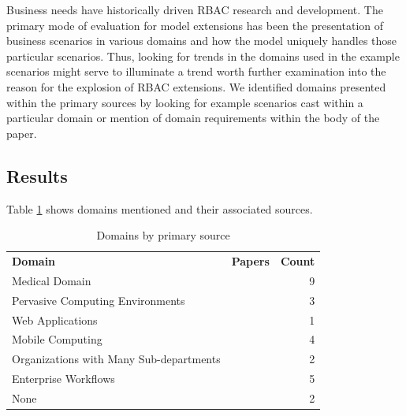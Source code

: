 Business needs have historically driven RBAC research and development.  The primary mode of evaluation for
model extensions has been the presentation of business scenarios in various domains and how the model
uniquely handles those particular scenarios.  Thus, looking for trends in the domains used in the example
scenarios might serve to illuminate a trend worth further examination into the reason for the explosion of
RBAC extensions.  We identified domains presented within the primary sources by looking for example
scenarios cast within a particular domain or mention of domain requirements within the body of the paper.

\subsection{Results}

Table \ref{tab:domains} shows domains mentioned and their associated sources.

\begin{table}
\centering
\caption{Domains by primary source}
\vspace{0.1 in}
\begin{tabular*}{.9\linewidth}{| p{.45\linewidth} | p{.3\linewidth} | r | }
\cline{1-3}

\textbf{Domain} & \textbf{Papers} & \textbf{Count} \\ \cline{1-3}
Medical Domain
&
\cite{alam06:constraint}
\cite{tzelepi01:flexible}
\cite{motta03:contextual}
\cite{ni2010privacy}
\cite{damiani2007geo}
\cite{hansen2003spatial}
\cite{samuel07:spatio-temporal}
\cite{aich09:role}
\cite{zhou2007team}
&
9 \\ \cline{1-3}
Pervasive Computing Environments
& 
\cite{huang06:pervasive}
\cite{chen08:spatio-temporal}
\cite{ray07:spatio}
&
3 \\ \cline{1-3}
Web Applications
& 
\cite{masoumzadeh2008purbac}
\cite{haibo05:context}
&
1 \\ \cline{1-3}
Mobile Computing
& 
\cite{thein2011leveraging}
\cite{zou2009crbac}
\cite{chandran05:llt}
\cite{aich09:role}
\cite{ray2006lrbac}
&
4 \\ \cline{1-3}
Organizations with Many Sub-departments
& 
\cite{yamazaki04:designing}
\cite{yao2008task}
&
2 \\ \cline{1-3}
Enterprise Workflows
&
\cite{cholewka00:acontext-sensitive}
\cite{bao08:role}
\cite{zhang06:collaborative}
\cite{oh2003task}
\cite{joshi05:generalized}
&
5 \\ \cline{1-3}
None
&
\cite{jian2008extended}
\cite{aich2007:STARBAC}
&
2 \\ \cline{1-3}

\end{tabular*}
\label{tab:domains}
\end{table}

